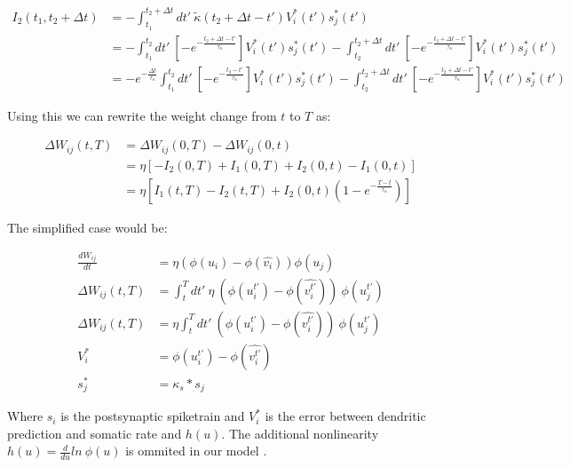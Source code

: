 \begin{align}
  I_2 (t_1, t_2 + \Delta t) & = -\int_{t_1}^{t_2 + \Delta t} dt' \ \tilde{\kappa} (t_2 + \Delta t - t') V_i^\ast (t') s_j^\ast (t')                                        \\
                            & = -\int_{t_1}^{t_2} dt' \ \left[ -e^{- \frac{t_2 + \Delta t - t'}{\tau_\kappa}} \right] V_i^\ast (t') s_j^\ast (t')
  -\int_{t_2}^{t_2 + \Delta t} dt' \ \left[ -e^{- \frac{t_2 + \Delta t - t'}{\tau_\kappa}} \right] V_i^\ast (t') s_j^\ast (t')                                             \\
                            & = -e^{- \frac{ \Delta t}{\tau_\kappa}} \int_{t_1}^{t_2} dt' \ \left[ -e^{- \frac{t_2 - t'}{\tau_\kappa}} \right] V_i^\ast (t') s_j^\ast (t')
  -\int_{t_2}^{t_2 + \Delta t} dt' \ \left[ -e^{- \frac{t_2 + \Delta t - t'}{\tau_\kappa}} \right] V_i^\ast (t') s_j^\ast (t')
\end{align}


Using this we can rewrite the weight change from $t$ to $T$ as:


\begin{align}
  \Delta W_{ij}(t,T) & = \Delta W_{ij}(0,T) - \Delta W_{ij}(0,t)                                               \\
                     & = \eta [-I_2(0,T) + I_1(0,T) + I_2(0,t) - I_1(0,t)]                                     \\
                     & = \eta [I_1(t,T) - I_2(t,T) + I_2(0,t)\left( 1 - e^{- \frac{T-t}{\tau_\kappa}} \right)]
\end{align}

The simplified \cite{sacramento2018dendritic} case would be:

\begin{align}
  \frac{dW_{ij}}{dt} & = \eta (\phi(u_i) - \phi(\hat{v_i})) \phi(u_j)                                         \\
  \Delta W_{ij}(t,T) & = \int_t^T dt' \ \eta \  (\phi(u_i^{t'}) - \phi(\widehat{v_i^{t'}})) \  \phi(u_j^{t'}) \\
  \Delta W_{ij}(t,T) & = \eta \int_t^T dt' \  (\phi(u_i^{t'}) - \phi(\widehat{v_i^{t'}})) \ \phi(u_j^{t'})    \\
  V_i^*              & = \phi(u_i^{t'}) - \phi(\widehat{v_i^{t'}})                                            \\
  s_j^*              & = \kappa_s * s_j
\end{align}


Where $s_i$ is the postsynaptic spiketrain and $V_i^*$ is the error between dendritic prediction and somatic rate and
$h( u )$. The additional nonlinearity $h( u ) = \frac{d}{du} ln \  \phi(u)$ is ommited in our model .




